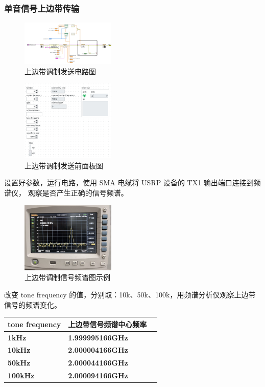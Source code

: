 \documentclass{../source/Experiment}
\begin{document}
\subsubsection{单音信号上边带传输}
\begin{figure}[H]
    \centering
    \includegraphics[width = 0.4\textwidth]{lab9/upper-side_IQ-a.jpg}
    \caption{上边带调制发送电路图}
\end{figure}
\begin{figure}[H]
    \centering
    \includegraphics[width = 0.4\textwidth]{lab9/upper-side_IQ-b.jpg}
    \caption{上边带调制发送前面板图}
\end{figure}
设置好参数，运行电路，使用 SMA 电缆将 USRP 设备的 TX1 输出端口连接到频谱仪， 观察是否产生正确的信号频谱。
\begin{figure}[H]
    \centering
    \includegraphics[width = 0.4\textwidth,angle=180]{lab9/5.jpg}
    \caption{上边带调制信号频谱图示例}
\end{figure}

改变 tone frequency 的值，分别取：10k、50k、100k，用频谱分析仪观察上边带 信号的频谱变化。
\begin{table}[H]
    \centering
    \begin{tabular}{|l|l|l|}
        \hline
        \textbf{tone frequency} & \textbf{上边带信号频谱中心频率} \\ \hline
        \textbf{1kHz}           & \textbf{1.999995166GHz}         \\ \hline
        \textbf{10kHz}          & \textbf{2.000004166GHz}         \\ \hline
        \textbf{50kHz}          & \textbf{2.000044166GHz}         \\ \hline
        \textbf{100kHz}         & \textbf{2.000094166GHz}         \\ \hline
    \end{tabular}
\end{table}
\end{document}
